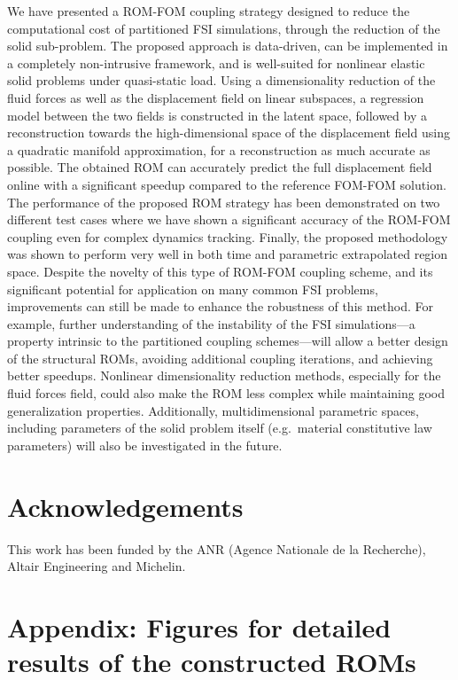 \documentclass[11pt]{article}
\begin{document}
We have presented a ROM-FOM coupling strategy designed to reduce the computational cost of partitioned FSI simulations, through the reduction of the solid sub-problem. The proposed approach is data-driven, can be implemented in a completely non-intrusive framework, and is well-suited for nonlinear elastic solid problems under quasi-static load. Using a dimensionality reduction of the fluid forces as well as the displacement field on linear subspaces, a regression model between the two fields is constructed in the latent space, followed by a reconstruction towards the high-dimensional space of the displacement field using a quadratic manifold approximation, for a reconstruction as much accurate as possible. The obtained ROM can accurately predict the full displacement field online with a significant speedup compared to the reference FOM-FOM solution. The performance of the proposed ROM strategy has been demonstrated on two different test cases where we have shown a significant accuracy of the ROM-FOM coupling even for complex dynamics tracking. Finally, the proposed methodology was shown to perform very well in both time and parametric extrapolated region space. Despite the novelty of this type of ROM-FOM coupling scheme, and its significant potential for application on many common FSI problems, improvements can still be made to enhance the robustness of this method. For example, further understanding of the instability of the FSI simulations---a property intrinsic to the partitioned coupling schemes---will allow a better design of the structural ROMs, avoiding additional coupling iterations, and achieving better speedups. Nonlinear dimensionality reduction methods, especially for the fluid forces field, could also make the ROM less complex while maintaining good generalization properties. Additionally, multidimensional parametric spaces, including parameters of the solid problem itself (e.g.\ material constitutive law parameters) will also be investigated in the future.

\section{Acknowledgements}

This work has been funded by the ANR (Agence Nationale de la Recherche), Altair Engineering and Michelin.

\appendix

\section{Appendix: Figures for detailed results of the constructed ROMs}
\end{document}
